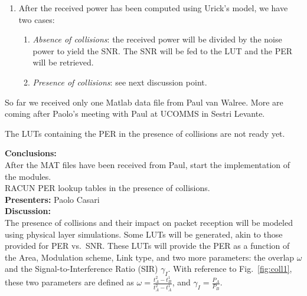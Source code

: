 \documentclass[11pt,journal,draftclsnofoot,onecolumn,twoside,letterpaper]{IEEEtran}
\theoremstyle{definition} \newtheorem{definition}[]{Definition}
\theoremstyle{theorem} \newtheorem{theorem}[]{Theorem}
\begin{document}
\begin{enumerate}
 \item After the received power has been computed using Urick's model, we have two cases:
	\begin{enumerate}
	 \item \emph{Absence of collisions}: the received power will be divided by the noise power to yield the SNR. The SNR will be fed to the LUT and the PER will be retrieved. 
	 \item \emph{Presence of collisions}: see next discussion point.
	\end{enumerate}
\end{enumerate} 

So far we received only one Matlab data file from Paul van Walree. More are coming after Paolo's meeting with Paul at UCOMMS in Sestri Levante.

The LUTs containing the PER in the presence of collisions are not ready yet.

{\bf Conclusions:}\\
After the MAT files have been received from Paul, start the implementation of the modules.
\  \\

 RACUN PER lookup tables in the presence of collisions.\\
{\bf Presenters:} Paolo Casari\\
{\bf Discussion:}\\

The presence of collisions and their impact on packet reception will be modeled using physical layer simulations. Some LUTs will be generated, akin to those provided for PER vs.~SNR. These LUTs will provide the PER as a function of the Area, Modulation scheme, Link type, and two more parameters: the overlap $\omega$ and the Signal-to-Interference Ratio (SIR) $\gamma_I$. 
With reference to Fig.~\ref{fig:coll1}, these two parameters are defined as $\omega = \frac{t_A^2 - t_B^1}{t_A^2-t_A^1}$, and $\gamma_I = \frac{P_A}{P_B}$.
\end{document}
